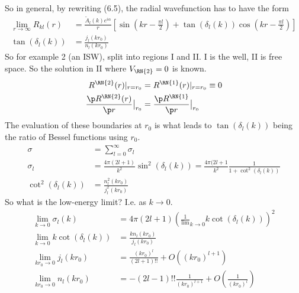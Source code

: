 \documentclass[a4paper, 11pt, normalem]{report}
\begin{document}
So in general, by rewriting (6.5), the radial wavefunction has to have the form 
\begin{align}
    \lim_{r\to\infty} R_{kl}(r) &= \frac{\tilde{A}_l(k)e^{i\alpha}}{r} \left[\sin\left(kr - \frac{\pi l}{2}\right) + \tan(\delta_l(k))\cos\left(kr - \frac{\pi l}{2}\right)\right] \\
    \tan(\delta_l(k)) &= \frac{j_l(kr_0)}{n_l(kr_0)}
\end{align}
So for example 2 (an ISW), split into regions \RN{1} and \RN{2}.
\RN{1} is the well, \RN{2} is free space. 
So the solution in \RN{2} where $V_{\RN{2}} = 0$ is known.
\begin{align}
    R^\RN{2}(r)|_{r=r_0} &= R^\RN{1}(r)|_{r=r_0} \equiv 0 \\
    \frac{\p R^\RN{2}(r)}{\p r}\big|_{r_0} &= \frac{\p R^\RN{1}}{\p r}\big|_{r_0}
\end{align}
The evaluation of these boundaries at $r_0$ is what leads to $\tan(\delta_l(k))$ being the ratio of Bessel functions using $r_0$.
\begin{align}
    \sigma &= \sum_{l=0}^\infty \sigma_l \\
    \sigma_l &= \frac{4\pi(2l+1)}{k^2}\sin^2(\delta_l(k)) = \frac{4\pi(2l+1}{k^2}\frac{1}{1 + \cot^2(\delta_l(k))} \\
    \cot^2(\delta_l(k)) &= \frac{n^2_l(kr_0)}{j^2_l(kr_0)}
\end{align}
So what is the low-energy limit? I.e. as $k \to 0$.
\begin{align}
    \lim_{k\to0} \sigma_l(k) &= 4\pi(2l+1)\left(\frac{1}\lim_{k\to0}{k\cot(\delta_l(k))}\right)^2 \\
    \lim_{k\to0} k\cot(\delta_l(k)) &= \frac{kn_l(kr_0)}{j_l(kr_0)} \\
    \lim_{kr_0\to0} j_l(kr_0) &= \frac{(kr_0)^l}{(2l+1)!!} + O((kr_0)^{l+1}) \\
    \lim_{kr_0\to0} n_l(kr_0) &= -(2l-1)!!\frac{1}{(kr_0)^{l+1}} + O\left(\frac{1}{(kr_0)^l}\right)
\end{align}
\end{document}
